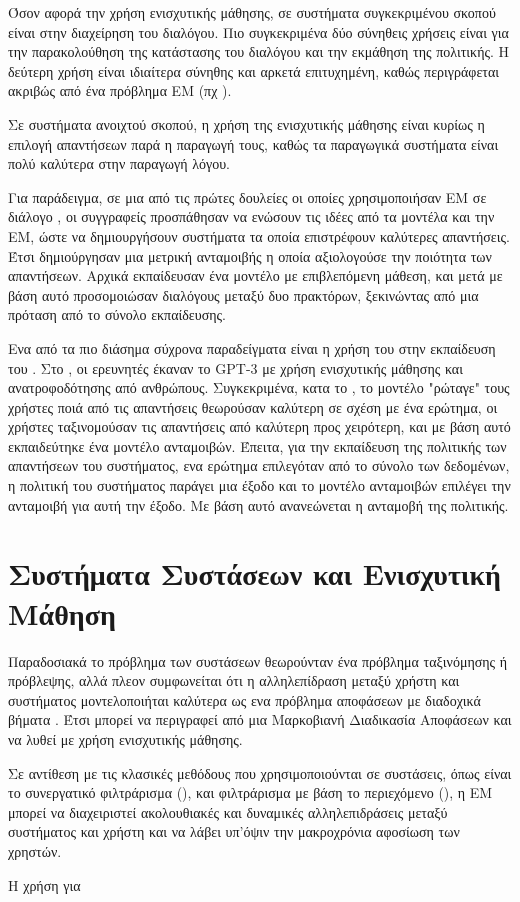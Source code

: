 Όσον αφορά την χρήση ενισχυτικής μάθησης, σε συστήματα συγκεκριμένου σκοπού είναι στην διαχείρηση του διαλόγου. Πιο συγκεκριμένα δύο σύνηθεις χρήσεις είναι για την παρακολούθηση της κατάστασης του διαλόγου και την εκμάθηση της πολιτικής. Η δεύτερη χρήση είναι ιδιαίτερα σύνηθης και αρκετά επιτυχημένη, καθώς περιγράφεται ακριβώς από ένα πρόβλημα ΕΜ (πχ \cite{policy_learning_2019}). 

Σε συστήματα ανοιχτού σκοπού, η χρήση της ενισχυτικής μάθησης είναι κυρίως η επιλογή απαντήσεων παρά η παραγωγή τους, καθώς τα παραγωγικά  συστήματα είναι πολύ καλύτερα στην παραγωγή λόγου. 

Για παράδειγμα, σε μια από τις πρώτες δουλείες οι οποίες χρησιμοποιήσαν ΕΜ σε διάλογο \cite{rl_dialogue_2016}, οι συγγραφείς προσπάθησαν να ενώσουν τις ιδέες από τα  μοντέλα και την ΕΜ, ώστε να δημιουργήσουν συστήματα τα οποία επιστρέφουν καλύτερες απαντήσεις. Έτσι δημιούργησαν μια μετρική ανταμοιβής η οποία αξιολογούσε την ποιότητα των απαντήσεων. Αρχικά εκπαίδευσαν ένα  μοντέλο με επιβλεπόμενη μάθεση, και μετά με βάση αυτό προσομοιώσαν διαλόγους μεταξύ δυο πρακτόρων, ξεκινώντας από μια πρόταση από το σύνολο εκπαίδευσης.

Ενα από τα πιο διάσημα σύχρονα παραδείγματα είναι η χρήση του στην εκπαίδευση του . Στο \cite{chatgpt_2022}, οι ερευνητές έκαναν  το {GPT-3} με χρήση ενισχυτικής μάθησης και ανατροφοδότησης από ανθρώπους. Συγκεκριμένα, κατα το , το μοντέλο "ρώταγε" τους χρήστες ποιά από τις απαντήσεις θεωρούσαν καλύτερη σε σχέση με ένα ερώτημα, οι χρήστες ταξινομούσαν τις απαντήσεις από καλύτερη προς χειρότερη, και με βάση αυτό εκπαιδεύτηκε ένα μοντέλο ανταμοιβών. Έπειτα, για την εκπαίδευση της πολιτικής των απαντήσεων του συστήματος, ενα ερώτημα επιλεγόταν από το σύνολο των δεδομένων, η πολιτική του συστήματος παράγει μια έξοδο και το μοντέλο ανταμοιβών επιλέγει την ανταμοιβή για αυτή την έξοδο. Με βάση αυτό ανανεώνεται η ανταμοβή της πολιτικής. 

\section{Συστήματα Συστάσεων και Ενισχυτική Μάθηση}

Παραδοσιακά το πρόβλημα των συστάσεων θεωρούνταν ένα πρόβλημα ταξινόμησης ή πρόβλεψης, αλλά πλεον συμφωνείται ότι η αλληλεπίδραση μεταξύ χρήστη και συστήματος μοντελοποιήται καλύτερα ως ενα πρόβλημα αποφάσεων με διαδοχικά βήματα \cite{rl_recommenders_2021}. Έτσι μπορεί να περιγραφεί από μια Μαρκοβιανή Διαδικασία Αποφάσεων και να λυθεί με χρήση ενισχυτικής μάθησης. 

Σε αντίθεση με τις κλασικές μεθόδους που χρησιμοποιούνται σε συστάσεις, όπως είναι το συνεργατικό φιλτράρισμα (), και φιλτράρισμα με βάση το περιεχόμενο (), η ΕΜ μπορεί να διαχειριστεί ακολουθιακές και δυναμικές αλληλεπιδράσεις μεταξύ συστήματος και χρήστη και να λάβει υπ'όψιν την μακροχρόνια αφοσίωση των χρηστών. 


Η χρήση  για 
